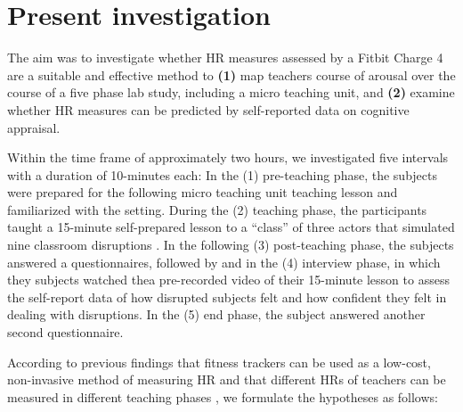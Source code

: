 \documentclass[preprint, 3p,
authoryear]{elsarticle} %
\begin{document}
%

\section{Present investigation}\label{present-investigation}

The aim was to investigate whether HR measures assessed by a Fitbit
Charge 4 are a suitable and effective method to \textbf{(1)} map
teachers course of arousal over the course of a five phase lab study,
including a micro teaching unit, and \textbf{(2)} examine whether HR
measures can be predicted by self-reported data on cognitive appraisal.

Within the time frame of approximately two hours, we investigated five
intervals with a duration of 10-minutes each: In the (1) pre-teaching
phase, the subjects were prepared for the following micro teaching unit
teaching lesson and familiarized with the setting. During the (2)
teaching phase, the participants taught a 15-minute self-prepared lesson
to a ``class'' of three actors that simulated nine classroom disruptions
. In the following (3) post-teaching phase, the subjects answered a
questionnaires, followed by and in the (4) interview phase, in which
they subjects watched thea pre-recorded video of their 15-minute lesson
to assess the self-report data of how disrupted subjects felt and how
confident they felt in dealing with disruptions. In the (5) end phase,
the subject answered another second questionnaire.

According to previous findings that fitness trackers can be used as a
low-cost, non-invasive method of measuring HR
\citep{hajj2022wrist, fuller2020reliability} and that different HRs of
teachers can be measured in different teaching phases
\citep{donker2020associations, junker2021potential}, we formulate the
hypotheses as follows:
\end{document}
